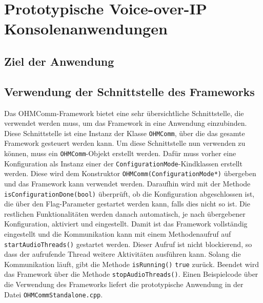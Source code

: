 \chapter{Prototypische Voice-over-IP Konsolenanwendungen}
\label{prototypProgram}
\section{Ziel der Anwendung}
\section{Verwendung der Schnittstelle des Frameworks}
Das OHMComm-Framework bietet eine sehr übersichtliche Schnittstelle, die verwendet werden muss, um das Framework in eine Anwendung einzubinden. Diese Schnittstelle ist eine Instanz der Klasse \texttt{OHMComm}, über die das gesamte Framework gesteuert werden kann. Um diese Schnittstelle nun verwenden zu können, muss ein \texttt{OHMComm}-Objekt erstellt werden. Dafür muss vorher eine Konfiguration als Instanz einer der \texttt{ConfigurationMode}-Kindklassen erstellt werden. Diese wird dem Konstruktor \texttt{OHMComm(ConfigurationMode*)} übergeben und das Framework kann verwendet werden. Daraufhin wird mit der Methode \texttt{isConfigurationDone\allowbreak{}(bool)} überprüft, ob die Konfiguration abgeschlossen ist, die über den Flag-Parameter gestartet werden kann, falls dies nicht so ist. Die restlichen Funktionalitäten werden danach automatisch, je nach übergebener Konfiguration, aktiviert und eingestellt. Damit ist das Framework vollständig eingestellt und die Kommunikation kann mit einem Methodenaufruf auf \texttt{startAudioThreads()} gestartet werden. Dieser Aufruf ist nicht blockierend, so dass der aufrufende Thread weitere Aktivitäten ausführen kann. Solang die Kommunikation läuft, gibt die Methode \texttt{isRunning()} \texttt{true} zurück. Beendet wird das Framework über die Methode \texttt{stopAudioThreads()}. Einen Beispielcode über die Verwendung des Frameworks liefert die prototypische Anwendung in der Datei \texttt{OHMCommStandalone.cpp}.
